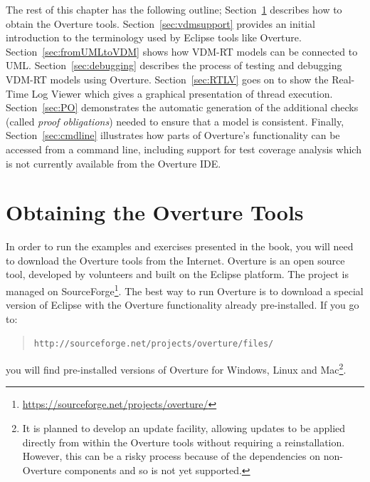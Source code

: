 The rest of this chapter has the following outline; Section~\ref{sec:install} describes how to obtain the Overture tools.
Section~\ref{sec:vdmsupport} provides an initial introduction to the
terminology used by Eclipse tools like Overture. 
Section~\ref{sec:fromUMLtoVDM} shows how VDM-RT models can be
connected to UML.
Section~\ref{sec:debugging} describes the process of testing and
debugging VDM-RT models using Overture. Section~\ref{sec:RTLV} goes on
to show the Real-Time Log Viewer which gives a graphical presentation
of thread execution.
Section~\ref{sec:PO} demonstrates the automatic generation of the
additional checks (called \emph{proof obligations}) needed to ensure
that a model is consistent.  Finally, Section~\ref{sec:cmdline}
illustrates how parts of Overture's functionality can be accessed from
a command line, including support for test coverage analysis which is
not currently available from the Overture IDE.

\section{Obtaining the Overture Tools}\label{sec:install}

In order to run the examples and exercises presented in the book, you
will need to download the Overture tools from the Internet.
Overture is an open source tool, developed by volunteers and built on
the Eclipse platform. The project is managed on
SourceForge\footnote{\url{https://sourceforge.net/projects/overture/}}.
The best way to run Overture is to download a special version of
Eclipse with the Overture functionality already pre-installed. If you
go to:
  \begin{quote}
  \texttt{http://sourceforge.net/projects/overture/files/}
  \end{quote}
  \noindent you will find pre-installed versions of Overture for
  Windows, Linux and Mac\footnote{It is planned to develop an update
    facility, allowing updates to be applied directly from within the
    Overture tools without requiring a reinstallation. However, this
    can be a risky process because of the dependencies on non-Overture
    components and so is not yet supported.}.

